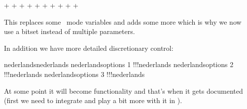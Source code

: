 \starttyping[style=\tt\small\small]
\chardef \completehyphenationmodecode \numexpr
    \normalhyphenationmodecode            %
  + \automatichyphenationmodecode         %
  + \explicithyphenationmodecode          %
  + \syllablehyphenationmodecode          %
  + \uppercasehyphenationmodecode         %
  + \compoundhyphenationmodecode          %
  + \automaticpenaltyhyphenationmodecode  %
  + \explicitpenaltyhyphenationmodecode   %
  + \permitgluehyphenationmodecode        %
  + \permitallhyphenationmodecode         %
  + \permitmathreplacehyphenationmodecode %
\relax
\stoptyping

This replaces some \LUATEX\ mode variables and adds some more which is why we now use
a bitset instead of multiple parameters.

\page

In addition we have more detailed discretionary control:

\startbuffer
nederlands\discretionary           {!}{!}{!}nederlands
nederlands\discretionary options 1 {!}{!}{!}nederlands
nederlands\discretionary options 2 {!}{!}{!}nederlands
nederlands\discretionary options 3 {!}{!}{!}nederlands
\stopbuffer

\typebuffer

\startlinecorrection[line]
 {}
    {} {}
    {} {}
    {} {}
\stopcombination
\stoplinecorrection

At some point it will become  functionality and that's when it gets
documented (first we need to integrate and play a bit more with it in \CONTEXT).

\stoptitle

\starttitle[title=Local control]

